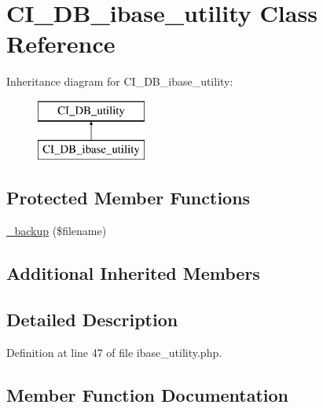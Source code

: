 \hypertarget{class_c_i___d_b__ibase__utility}{}\section{C\+I\+\_\+\+D\+B\+\_\+ibase\+\_\+utility Class Reference}
\label{class_c_i___d_b__ibase__utility}
Inheritance diagram for C\+I\+\_\+\+D\+B\+\_\+ibase\+\_\+utility\+:\begin{figure}[H]
\begin{center}
\leavevmode
\includegraphics[height=2.000000cm]{class_c_i___d_b__ibase__utility}
\end{center}
\end{figure}
\subsection*{Protected Member Functions}
\begin{DoxyCompactItemize}
\item 
\mbox{\hyperlink{class_c_i___d_b__ibase__utility_a25acdcc54da34a10f507e2abd93feca1}{\+\_\+backup}} (\$filename)
\end{DoxyCompactItemize}
\subsection*{Additional Inherited Members}


\subsection{Detailed Description}


Definition at line 47 of file ibase\+\_\+utility.\+php.



\subsection{Member Function Documentation}
\mbox{\label{class_c_i___d_b__ibase__utility_a25acdcc54da34a10f507e2abd93feca1}} 
